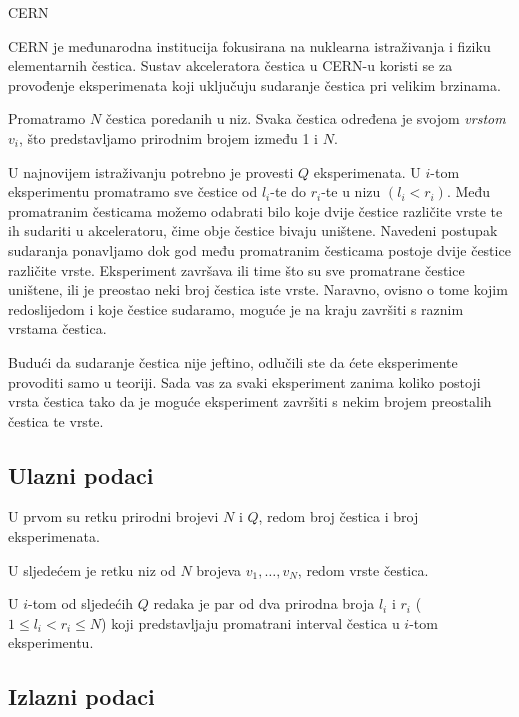\begin{statement}[
  problempoints=100,
  timelimit=1.5 sekunda,
  memorylimit=512 MiB,
]{CERN}

CERN je međunarodna institucija fokusirana na nuklearna istraživanja i fiziku elementarnih čestica. 
Sustav akceleratora čestica u CERN-u koristi se za provođenje eksperimenata koji uključuju sudaranje čestica pri velikim brzinama. 

Promatramo $N$ čestica poredanih u niz. Svaka čestica određena je svojom \textit{vrstom} $v_i$, što 
predstavljamo prirodnim brojem između 1 i $N$. 

U najnovijem istraživanju potrebno je provesti $Q$ eksperimenata. U $i$-tom eksperimentu 
promatramo sve čestice od $l_i$-te do $r_i$-te u nizu $(l_i < r_i)$. Među promatranim česticama 
možemo odabrati bilo koje dvije čestice različite vrste te ih sudariti u akceleratoru, čime obje 
čestice bivaju uništene. Navedeni postupak sudaranja ponavljamo dok god među promatranim česticama 
postoje dvije čestice različite vrste. Eksperiment završava ili time što su sve promatrane čestice 
uništene, ili je preostao neki broj čestica iste vrste. Naravno, ovisno o tome kojim redoslijedom i 
koje čestice sudaramo, moguće je na kraju završiti s raznim vrstama čestica. 

Budući da sudaranje čestica nije jeftino, 
odlučili ste da ćete eksperimente provoditi samo u teoriji. Sada vas za svaki eksperiment zanima 
koliko postoji vrsta čestica tako da je moguće eksperiment završiti s nekim brojem preostalih 
čestica te vrste. 

\subsection*{Ulazni podaci}

U prvom su retku prirodni brojevi $N$ i $Q$, redom broj čestica i broj eksperimenata.

U sljedećem je retku niz od $N$ brojeva $v_1, \dots, v_N$, redom vrste čestica. 

U $i$-tom od sljedećih $Q$ redaka je par od dva prirodna broja $l_i$ i $r_i$ 
($1 \leq l_i < r_i \leq N$) koji predstavljaju promatrani interval čestica u $i$-tom eksperimentu.  

\subsection*{Izlazni podaci}


\end{statement}
